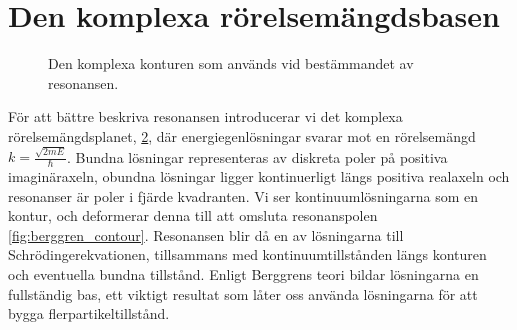 \documentclass[12pt,a4paper]{article}
\begin{document}
\begin{figure}[h]
  \label{fig:resonance_wavefunction}
  \end{figure}
  
\section{Den komplexa rörelsemängdsbasen}

\begin{figure}[t]
  \centering
  \caption{Den komplexa konturen som används vid bestämmandet av resonansen.}
  \label{fig:simple_contour}
\end{figure}

För att bättre beskriva resonansen introducerar vi det komplexa rörelsemängdsplanet, \cref{fig:simple_contour}, där energiegenlösningar svarar mot en rörelsemängd $k = \frac{\sqrt{2mE}}{{\hbar}}$.
Bundna lösningar representeras av diskreta poler på positiva imaginäraxeln, obundna lösningar ligger kontinuerligt längs positiva realaxeln och resonanser är poler i fjärde kvadranten.
Vi ser kontinuumlösningarna som en kontur, och deformerar denna till att omsluta resonanspolen \cref{fig:berggren_contour}. 
Resonansen blir då en av lösningarna till Schrödingerekvationen, tillsammans med kontinuumtillstånden längs konturen och eventuella bundna tillstånd.
Enligt Berggrens teori \cite{berggren} bildar lösningarna en fullständig bas, ett viktigt resultat som låter oss använda lösningarna för att bygga flerpartikeltillstånd.
\end{document}
